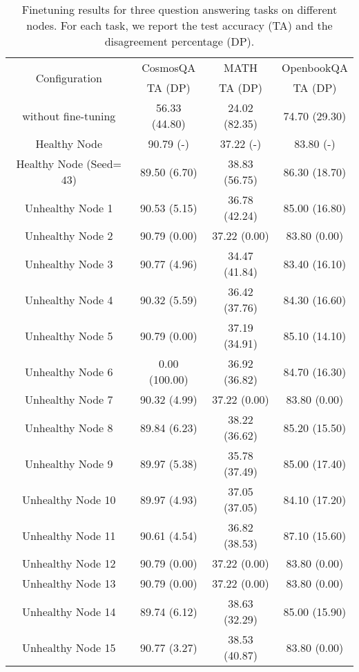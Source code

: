 \begin{table}[t]

\begin{center}
\begin{tiny}
\begin{sc}
\setlength{\tabcolsep}{3pt}
\begin{tabular}{cccc}
\toprule
\multirow{2}{*}{Configuration} & CosmosQA & MATH & OpenbookQA \\
 & TA (DP) & TA (DP) & TA (DP) \\
\midrule
without fine-tuning & 56.33 (44.80) & 24.02 (82.35) & 74.70 (29.30) \\
\midrule
Healthy Node & 90.79 (-) & 37.22 (-) & 83.80 (-) \\
Healthy Node (Seed=$43$) & 89.50 (6.70) & 38.83 (56.75) & 86.30 (18.70) \\
\midrule
Unhealthy Node 1 & 90.53 (5.15) & 36.78 (42.24) & 85.00 (16.80) \\
Unhealthy Node 2 & 90.79 (0.00) & 37.22 (0.00) & 83.80 (0.00) \\
Unhealthy Node 3 & 90.77 (4.96) & 34.47 (41.84) & 83.40 (16.10) \\
Unhealthy Node 4 & 90.32 (5.59) & 36.42 (37.76) & 84.30 (16.60) \\
Unhealthy Node 5 & 90.79 (0.00) & 37.19 (34.91) & 85.10 (14.10) \\
Unhealthy Node 6 & 0.00 (100.00) & 36.92 (36.82) & 84.70 (16.30) \\
Unhealthy Node 7 & 90.32 (4.99) & 37.22 (0.00) & 83.80 (0.00) \\
Unhealthy Node 8 & 89.84 (6.23) & 38.22 (36.62) & 85.20 (15.50) \\
Unhealthy Node 9 & 89.97 (5.38) & 35.78 (37.49) & 85.00 (17.40) \\
Unhealthy Node 10 & 89.97 (4.93) & 37.05 (37.05) & 84.10 (17.20) \\
Unhealthy Node 11 & 90.61 (4.54) & 36.82 (38.53) & 87.10 (15.60) \\
Unhealthy Node 12 & 90.79 (0.00) & 37.22 (0.00) & 83.80 (0.00) \\
Unhealthy Node 13 & 90.79 (0.00) & 37.22 (0.00) & 83.80 (0.00) \\
Unhealthy Node 14 & 89.74 (6.12) & 38.63 (32.29) & 85.00 (15.90) \\
Unhealthy Node 15 & 90.77 (3.27) & 38.53 (40.87) & 83.80 (0.00) \\
\bottomrule
\end{tabular}


\end{sc}
\end{tiny}
\end{center}
\vskip -0.1in
\caption{Finetuning results for three question answering tasks on different nodes. For each task, we report the test accuracy (TA) and the disagreement percentage (DP).}
\label{tab:finetuning_results_short}

\vskip -0.2in
\end{table}


